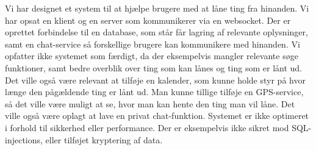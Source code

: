 Vi har designet et system til at hjælpe brugere med at låne ting fra hinanden. Vi har opsat en klient og en server som kommunikerer via en websocket. Der er oprettet forbindelse til en database, som står får lagring af relevante oplysninger, samt en chat-service så forskellige brugere kan kommunikere med hinanden.
\newline
\noindent
Vi opfatter ikke systemet som færdigt, da der eksempelvis mangler relevante søge funktioner, samt bedre overblik over ting som kan lånes og ting som er lånt ud. Det ville også være relevant at tilføje en kalender, som kunne holde styr på hvor længe den pågældende ting er lånt ud. Man kunne tillige tilføje en GPS-service, så det ville være muligt at se, hvor man kan hente den ting man vil låne. Det ville også være oplagt at lave en privat chat-funktion.
\newline
\noindent
Systemet er ikke optimeret i forhold til sikkerhed eller performance. Der er eksempelvis ikke sikret mod SQL-injections, eller tilføjet kryptering af data.